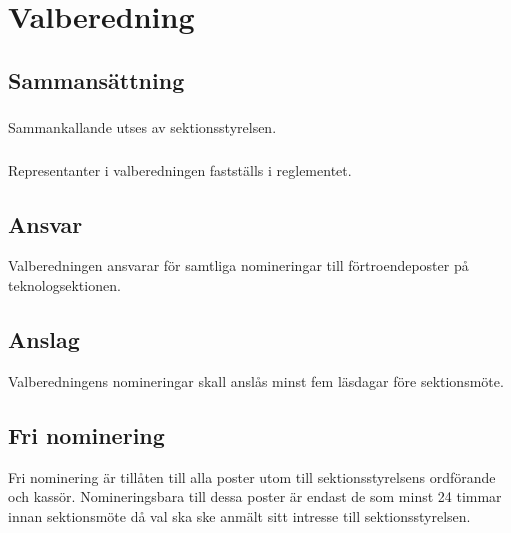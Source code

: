 \section{Valberedning}

\subsection{Sammansättning}

\subsubsection{}
Sammankallande utses av sektionsstyrelsen.

\subsubsection{}
Representanter i valberedningen fastställs i reglementet.

\subsection{Ansvar}
Valberedningen ansvarar för samtliga nomineringar till
förtroendeposter på teknologsektionen.

\subsection{Anslag}
Valberedningens nomineringar skall anslås minst fem läsdagar före
sektionsmöte.

\subsection{Fri nominering}
Fri nominering är tillåten till alla poster utom till
sektionsstyrelsens ordförande och kassör. Nomineringsbara till dessa
poster är endast de som minst 24 timmar innan sektionsmöte då val ska
ske anmält sitt intresse till sektionsstyrelsen.
